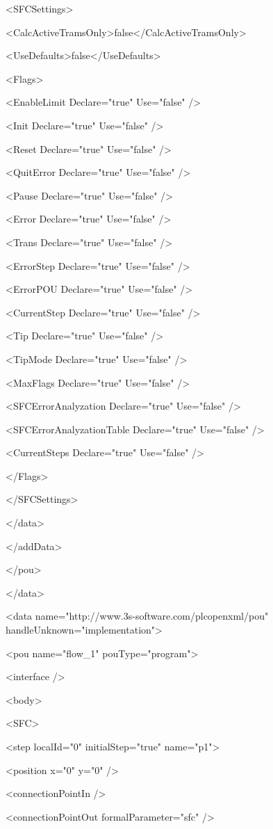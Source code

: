 { <SFCSettings>

  <CalcActiveTramsOnly>false</CalcActiveTramsOnly>

  <UseDefaults>false</UseDefaults>

  <Flags>

   <EnableLimit Declare="true" Use="false" />

   <Init Declare="true" Use="false" />

   <Reset Declare="true" Use="false" />

   <QuitError Declare="true" Use="false" />

   <Pause Declare="true" Use="false" />

   <Error Declare="true" Use="false" />

   <Trans Declare="true" Use="false" />

   <ErrorStep Declare="true" Use="false" />

   <ErrorPOU Declare="true" Use="false" />

   <CurrentStep Declare="true" Use="false" />

   <Tip Declare="true" Use="false" />

   <TipMode Declare="true" Use="false" />

   <MaxFlags Declare="true" Use="false" />

   <SFCErrorAnalyzation Declare="true" Use="false" />

   <SFCErrorAnalyzationTable Declare="true" Use="false" />

   <CurrentSteps Declare="true" Use="false" />

  </Flags>

 </SFCSettings>

</data>

</addData>

</pou>

</data>

<data name="http://www.3s-software.com/plcopenxml/pou" handleUnknown="implementation">

<pou name="flow\_1" pouType="program">

<interface />

<body>

<SFC>

 <step localId="0" initialStep="true" name="p1">

  <position x="0" y="0" />

  <connectionPointIn />

  <connectionPointOut formalParameter="sfc" />

}
